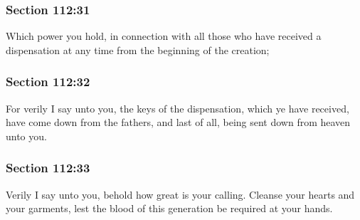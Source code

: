 	\subsubsection{Section 112:31} %
		\label{DC112-31}

		Which power you hold, in connection with all those who have received a dispensation at any time from the beginning of the creation;


	\subsubsection{Section 112:32} %
		\label{DC112-32}

		For verily I say unto you, the keys of the dispensation, which ye have received, have come down from the fathers, and last of all, being sent down from heaven unto you.


	\subsubsection{Section 112:33} %
		\label{DC112-33}

		Verily I say unto you, behold how great is your calling.  Cleanse your hearts and your garments, lest the blood of this generation be required at your hands.



